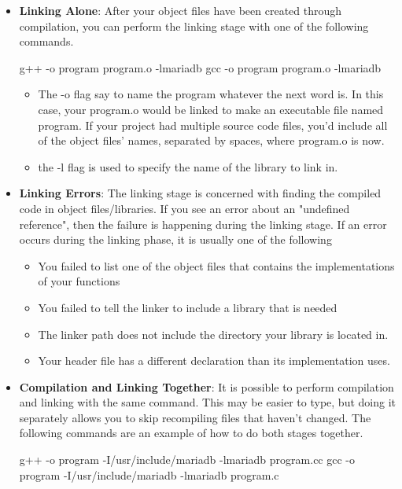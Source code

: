 \documentclass{report}
\begin{document}
\begin{itemize}
\begin{itemize}
            \end{itemize}
        \item \textbf{Linking Alone}: After your object files have been created through compilation, you can perform the linking stage with one of the following commands.
            \bigbreak \noindent 
            \begin{cppcode}
                g++ -o program program.o -lmariadb
                gcc -o program program.o -lmariadb
            \end{cppcode}
            \begin{itemize}
                \item The -o flag say to name the program whatever the next word is. In this case, your program.o would be linked to make an executable file named program. If your project had multiple source code files, you’d include all of the object files’ names, separated by spaces, where program.o is now.
                \item the -l flag is used to specify the name of the library to link in.
            \end{itemize}
        \item \textbf{Linking Errors}: The linking stage is concerned with finding the compiled code in object files/libraries. If you see an error about an "undefined reference", then the failure is happening during the linking stage. If an error occurs during the linking phase, it is usually one of the following
            \begin{itemize}
                \item You failed to list one of the object files that contains the implementations of your functions
                \item You failed to tell the linker to include a library that is needed
                \item The linker path does not include the directory your library is located in.
                \item Your header file has a different declaration than its implementation uses.
            \end{itemize}
        \item \textbf{Compilation and Linking Together}: It is possible to perform compilation and linking with the same command. This may be easier to type, but doing it separately allows you to skip recompiling files that haven’t changed. The following commands are an example of how to do both stages together.
            \bigbreak \noindent 
            \begin{cppcode}
                g++ -o program -I/usr/include/mariadb -lmariadb program.cc
                gcc -o program -I/usr/include/mariadb -lmariadb program.c
            \end{cppcode}

    \end{itemize}
\end{document}
